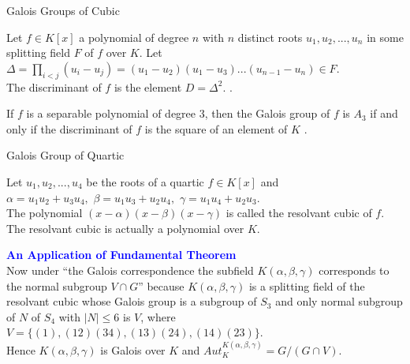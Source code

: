 \documentclass{beamer}
\begin{document}
\begin{frame}{Galois Groups of Cubic}
\begin{definition}
  Let \(f \in K[x]\) a polynomial of degree \(n\) with \(n\) distinct roots \(u_1,u_2,...,u_n\) in some splitting field \(F\) of \(f\) over \(K\). Let \(\Delta = \prod\limits_{i<j}(u_i-u_j) = (u_1-u_2)(u_1-u_3)...(u_{n-1}-u_n) \in F\).\\
  The discriminant of \(f\) is the element \(D= {\Delta}^2\). \cite{hunger}.
\end{definition}

\begin{theorem}[Theorem]
  If \(f\) is a separable polynomial of degree \(3\), then the Galois group of \(f\) is \(A_3\) if and only if the discriminant of \(f\) is the square of an element of \(K\) \cite{hunger}.
\end{theorem}
\end{frame}

\begin{frame}{Galois Group of Quartic}
  \begin{definition}
Let \(u_1,u_2,...,u_4\) be the roots of a quartic \(f \in K[x]\) and\\ \(\alpha=u_1u_2+u_3u_4,\) \(\beta=u_1u_3+u_2u_4,\) \(\gamma=u_1u_4+u_2u_3\). \\[3mm]
The polynomial \( (x- \alpha)(x- \beta)(x- \gamma) \) is called the resolvant cubic of \(f\). The resolvant cubic is actually a polynomial over \(K\)\cite{hunger}.
\end{definition}

\textbf{\textcolor{blue}{An Application of Fundamental Theorem}} \\[3mm]
Now under ``the Galois correspondence the subfield \(K(\alpha, \beta, \gamma)\) corresponds to the normal subgroup \(V \cap G\)'' \cite{hunger} because \(K(\alpha,\beta,\gamma)\) is a splitting field of the resolvant cubic
whose Galois group is a subgroup of \(S_3\) and only normal subgroup of \(N\) of \(S_4\) with \(|N| \leq 6\) is \(V\), where \(V=\{(1),(12)(34),(13)(24),(14)(23)\}\).\\
Hence \(K(\alpha, \beta, \gamma)\) is Galois over \(K\) and \(Aut_K^{K(\alpha, \beta, \gamma)} = G/(G \cap V)\)\cite{hunger}.
\end{frame}
\end{document}
